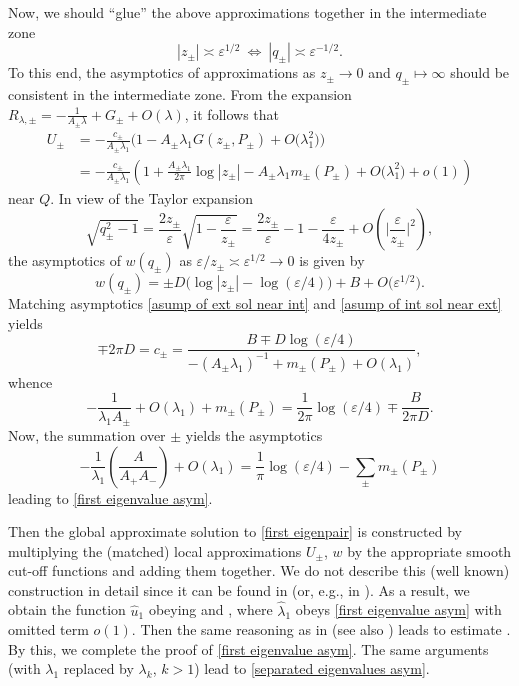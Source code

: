 \documentclass[pdftex]{sigma}
\numberwithin{equation}{section}
\theoremstyle{definition}
\begin{document}
Now, we should ``glue'' the above approximations together in the intermediate zone
\[|z_\pm|\asymp\varepsilon^{1/2} \ \Leftrightarrow \ |q_\pm|\asymp \varepsilon^{-1/2}.\]
To this end, the asymptotics of approximations as $z_\pm\to 0$ and $q_\pm\mapsto \infty$ should be consistent in the intermediate zone. From the expansion $R_{\lambda,\pm}=-\frac{1}{A_\pm\lambda}+G_\pm+O(\lambda)$, it follows that
\begin{align}
U_\pm&=-\frac{c_\pm}{A_\pm\lambda_1}\bigl(1-A_\pm\lambda_1 G(z_\pm,P_\pm)+O\bigl(\lambda_1^2\bigr)\bigr)\nonumber\\
&=-\frac{c_\pm}{A_\pm\lambda_1}\left(1+\frac{A_\pm\lambda_1}{2\pi} \log |z_\pm|-A_\pm\lambda_1 m_\pm(P_\pm)+O\bigl(\lambda_1^2\bigr)+o(1)\right)\label{asump of ext sol near int}
\end{align}
near $Q$. In view of the Taylor expansion
\[\sqrt{q_\pm^2-1}=\frac{2z_\pm}{\varepsilon}\sqrt{1-\frac{\varepsilon}{z_\pm}}=\frac{2z_\pm}{\varepsilon}-1-\frac{\varepsilon}{4z_\pm}+O\left(\Big|\frac{\varepsilon}{z_\pm}\Big|^2\right),\]
the asymptotics of $w(q_\pm)$ as $\varepsilon/z_\pm\asymp\varepsilon^{1/2}\to 0$ is given by
\begin{equation}
\label{asump of int sol near ext}
w(q_\pm)=\pm D\bigl(\log |z_\pm|-\log (\varepsilon/4)\bigr)+B+O\bigl(\varepsilon^{1/2}\bigr) .
\end{equation}
{\samepage Matching asymptotics \eqref{asump of ext sol near int} and \eqref{asump of int sol near ext} yields
\[\mp 2\pi D=c_\pm=\frac{B\mp D\log (\varepsilon/4)}{-(A_\pm\lambda_1)^{-1}+m_\pm(P_\pm)+O(\lambda_1)},\]
whence
\[-\frac{1}{\lambda_1 A_\pm}+O(\lambda_1)+m_\pm(P_\pm)=\frac{1}{2\pi}\log (\varepsilon/4)\mp \frac{B}{2\pi D}.\]
Now, the summation over $\pm$ yields the asymptotics
\[-\frac{1}{\lambda_1}\left(\frac{A}{A_+A_-}\right)+O(\lambda_1)=\frac{1}{\pi}\log (\varepsilon/4)-\sum_\pm m_\pm(P_\pm)\]
leading to \eqref{first eigenvalue asym}.}

Then the global approximate solution to \eqref{first eigenpair} is constructed by multiplying the (matched) local approximations $U_\pm$, $w$ by the appropriate smooth cut-off functions and adding them together. We do not describe this (well known) construction in detail since it can be found in \cite[Chapter~6]{MNP} (or, e.g., in \cite{KorSIF}). As a result, we obtain the function $\hat{u}_1$ obeying  and , where $\hat{\lambda}_1$ obeys \eqref{first eigenvalue asym} with omitted term $o(1)$. Then the same reasoning as in \cite[Section 4.2]{MNP} (see also \cite{KorMax}) leads to estimate . By this, we complete the proof of \eqref{first eigenvalue asym}. The same arguments (with $\lambda_1$ replaced by $\lambda_k$, $k>1$) lead to \eqref{separated eigenvalues asym}.
\end{document}
